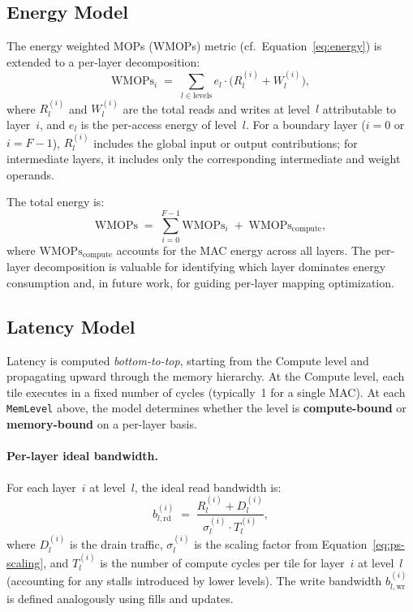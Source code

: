 \subsection{Energy Model}
\label{sec:ps-energy}

The energy weighted MOPs (WMOPs) metric (cf.\ Equation~\ref{eq:energy}) is
extended to a per-layer decomposition:
%
\begin{equation}
\label{eq:ps-wmops-per-layer}
  \text{WMOPs}_i \;=\;
    \sum_{l \in \text{levels}}
      e_l \cdot \bigl(R_l^{(i)} + W_l^{(i)}\bigr),
\end{equation}
%
\noindent
where $R_l^{(i)}$ and $W_l^{(i)}$ are the total reads and writes at
level~$l$ attributable to layer~$i$, and $e_l$ is the per-access
energy of level~$l$.
For a boundary layer ($i = 0$ or $i = F\!-\!1$), $R_l^{(i)}$ includes
the global input or output contributions; for intermediate layers, it
includes only the corresponding intermediate and weight operands.

The total energy is:
%
\begin{equation}
\label{eq:ps-wmops-total}
  \text{WMOPs} \;=\;
    \sum_{i=0}^{F-1} \text{WMOPs}_i
    \;+\;
    \text{WMOPs}_{\text{compute}},
\end{equation}
%
\noindent
where $\text{WMOPs}_{\text{compute}}$ accounts for the MAC energy
across all layers.
The per-layer decomposition is valuable for identifying which
layer dominates energy consumption and, in future work, for guiding
per-layer mapping optimization.


\subsection{Latency Model}
\label{sec:ps-latency}

Latency is computed \emph{bottom-to-top}, starting from the Compute
level and propagating upward through the memory hierarchy.
At the Compute level, each tile executes in a fixed number of cycles
(typically~1 for a single MAC).
At each \texttt{MemLevel} above, the model determines whether the
level is \textbf{compute-bound} or \textbf{memory-bound} on a
per-layer basis.

\paragraph{Per-layer ideal bandwidth.}
For each layer~$i$ at level~$l$, the ideal read bandwidth is:
%
\begin{equation}
\label{eq:ps-ideal-bw}
  b_{l,\text{rd}}^{(i)} \;=\;
    \frac{R_l^{(i)} + D_l^{(i)}}
         {\sigma_l^{(i)} \cdot T_l^{(i)}},
\end{equation}
%
\noindent
where $D_l^{(i)}$ is the drain traffic, $\sigma_l^{(i)}$ is the
scaling factor from Equation~\ref{eq:ps-scaling}, and $T_l^{(i)}$ is
the number of compute cycles per tile for layer~$i$ at level~$l$
(accounting for any stalls introduced by lower levels).
The write bandwidth $b_{l,\text{wr}}^{(i)}$ is defined analogously
using fills and updates.


